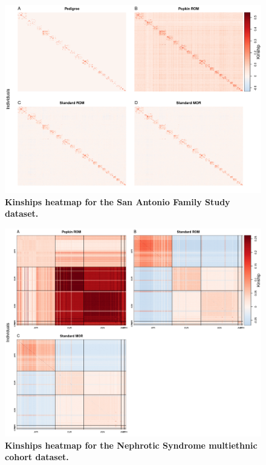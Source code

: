 \documentclass[11pt]{article}
\begin{document}
\begin{figure}[bp!]
  \centering
  \includegraphics[width=\textwidth]{data/SFig_T2D_kinships.png}
  \caption{
    {\bf Kinships heatmap for the San Antonio Family
Study dataset.}
    }
  \label{fig:T2D_kinships}
\end{figure}

\begin{figure}[bp!]
  \centering
  \includegraphics[width=\textwidth]{data/SFig_NS_sex_array_kinships.png}
  \caption{
    {\bf Kinships heatmap for the Nephrotic Syndrome multiethnic cohort dataset.}
    }
  \label{fig:NS_kinships}
\end{figure}
\end{document}
